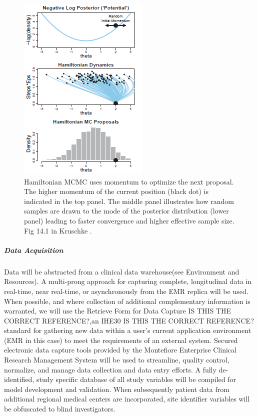 \documentclass[11pt,notitlepage]{article}
\begin{document}
\begin{figure}
 \vspace{-70pt}
 \includegraphics[scale=1]{Figures/Hamiltonian.png}
  \vspace{-30pt}
  \caption{\footnotesize Hamiltonian MCMC uses momentum to optimize the next proposal. The higher momentum of the current position (black dot) is indicated in the top panel. The middle panel illustrates how random samples are drawn to the mode of the posterior distribution (lower panel) leading to faster convergence and higher effective sample size. Fig 14.1 in Kruschke \cite{Kruschke_Book_2014}.}
    \label{fig:Hamiltonian}
 \vspace{- 15 pt}
\end{figure}

\subparagraph*{Data Acquisition}
Data will be abstracted from a clinical data warehouse(see Environment and Resources). A multi-prong approach for capturing complete, longitudinal data in real-time, near real-time, or asynchronously from the EMR replica will be used. When possible, and where collection of additional complementary information is warranted, we will use the Retrieve Form for Data Capture IS THIS THE CORRECT REFERENCE?\cite{Rothenhaeusler_2005},an IHE30 IS THIS THE CORRECT REFERENCE? \cite{Rotte_15809512} standard for gathering new data within a user's current application environment (EMR in this case) to meet the requirements of an external system. Secured electronic data capture tools provided by the Montefiore Enterprise Clinical Research Management System will be used to streamline, quality control, normalize, and manage data collection and data entry efforts. A fully de-identified, study specific database of all study variables will be compiled for model development and validation. When subsequently patient data from additional regional medical centers are incorporated, site identifier variables will be obfuscated to blind investigators.
\end{document}
